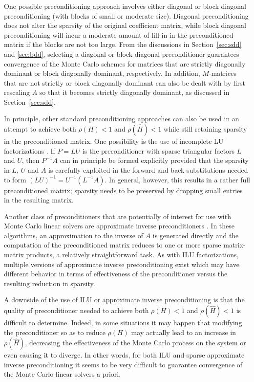 \documentclass[final,leqno,onefignum,onetabnum]{siamltex1213}
\begin{document}
One possible preconditioning approach involves either diagonal or block
diagonal preconditioning (with blocks of small or moderate size). Diagonal
preconditioning does not alter the sparsity of the original coefficient matrix,
while block diagonal preconditioning will incur a moderate amount of
fill-in in the preconditioned matrix if the blocks are not too large.
From the discussions in Section~\ref{sec:sdd}
and \ref{sec:bdd}, selecting a diagonal or block diagonal preconditioner 
guarantees convergence of the Monte Carlo schemes
for matrices that are strictly diagonally dominant
or block diagonally dominant, respectively. In addition, $M$-matrices
that are not strictly or block diagonally dominant can also be dealt with by
first rescaling $A$ so that it becomes strictly diagonally dominant, as
discussed in Section~\ref{sec:sdd}.

In principle,
other standard preconditioning approaches can also be used in an attempt
to achieve both $\rho(H)<1$ and $\rho(\hat{H})<1$ while still retaining 
sparsity in the preconditioned matrix.  One possibility is the use of incomplete
LU factorizations \cite{Benzi2002,Saad}.  If $P=LU$ is the preconditioner
with sparse triangular factors $L$ and $U$, then $P^{-1}A$ can in principle
be formed explicitly
provided that the sparsity in $L$, $U$ and $A$
is carefully exploited in the forward and back substitutions
needed to form $(LU)^{-1}=U^{-1}(L^{-1}A)$. In general, 
however, this results in a
rather full preconditioned matrix; sparsity needs to be preserved by dropping
small entries in
the resulting matrix. 

Another class of preconditioners that are potentially of interest 
for use with Monte Carlo
linear solvers are approximate inverse preconditioners 
\cite{Benzi2002}.  In these algorithms, an approximation
to the inverse of $A$ is generated directly and the computation of the
preconditioned matrix reduces to one or more sparse matrix-matrix products, 
a relatively
straightforward task.  As with ILU factorizations,
multiple versions of approximate inverse preconditioning exist which may
have different behavior in terms of effectiveness of the preconditioner
versus the resulting reduction in sparsity.

A downside of the use of ILU or approximate inverse preconditioning is that
the quality of preconditioner needed to achieve both $\rho(H)<1$
and $\rho(\hat{H})<1$ is difficult to determine.
Indeed, in some situations it may happen that
modifying the preconditioner so as to reduce $\rho(H)$ may actually lead to an
increase in $\rho(\hat{H})$, decreasing the effectiveness of the Monte
Carlo process on the system or even causing it to diverge.
In other words, for both ILU and sparse approximate inverse
preconditioning it seems to be very difficult to guarantee convergence
of the Monte Carlo linear solvers a priori.
\end{document}
